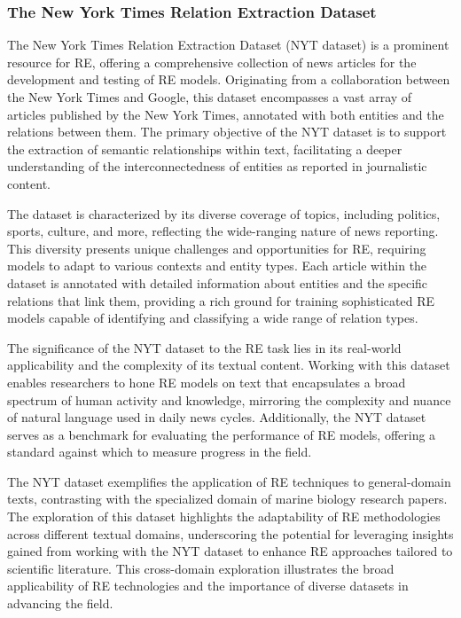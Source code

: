 \subsubsection{The New York Times Relation Extraction Dataset}
\label{sec:nytdataset}

The New York Times Relation Extraction Dataset (NYT dataset) is a prominent resource for RE, offering a comprehensive collection of news articles for the development and testing of RE models. Originating from a collaboration between the New York Times and Google, this dataset encompasses a vast array of articles published by the New York Times, annotated with both entities and the relations between them\cite{NYTRE}. The primary objective of the NYT dataset is to support the extraction of semantic relationships within text, facilitating a deeper understanding of the interconnectedness of entities as reported in journalistic content.

The dataset is characterized by its diverse coverage of topics, including politics, sports, culture, and more, reflecting the wide-ranging nature of news reporting. This diversity presents unique challenges and opportunities for RE, requiring models to adapt to various contexts and entity types. Each article within the dataset is annotated with detailed information about entities and the specific relations that link them, providing a rich ground for training sophisticated RE models capable of identifying and classifying a wide range of relation types.

The significance of the NYT dataset to the RE task lies in its real-world applicability and the complexity of its textual content. Working with this dataset enables researchers to hone RE models on text that encapsulates a broad spectrum of human activity and knowledge, mirroring the complexity and nuance of natural language used in daily news cycles. Additionally, the NYT dataset serves as a benchmark for evaluating the performance of RE models, offering a standard against which to measure progress in the field.

The NYT dataset exemplifies the application of RE techniques to general-domain texts, contrasting with the specialized domain of marine biology research papers. The exploration of this dataset highlights the adaptability of RE methodologies across different textual domains, underscoring the potential for leveraging insights gained from working with the NYT dataset to enhance RE approaches tailored to scientific literature. This cross-domain exploration illustrates the broad applicability of RE technologies and the importance of diverse datasets in advancing the field.

